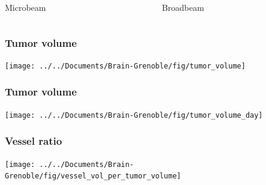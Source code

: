 \documentclass{beamer}					%
\newcommand{\imsize}{\linewidth}
\newlength\imagewidth %
\newlength\imagescale %
\begin{document}
\begin{frame}
\begin{columns}
\begin{column}{0.33\paperwidth}
%
            \centering Microbeam
		\end{column}
		\begin{column}{0.33\paperwidth}
            \pgfmathsetlength{\imagewidth}{\imsize}%
            \def\x{1001/3}%
            \def\y{978/3}%
            \centering Broadbeam
		\end{column}
	\end{columns}
\end{frame}

\renewcommand{\imsize}{0.8\textheight}
\begin{frame}
	\frametitle{Tumor volume}
	\texttt{[image: ../../Documents/Brain-Grenoble/fig/tumor\_volume]}
\end{frame}

\begin{frame}
	\frametitle{Tumor volume}
	\texttt{[image: ../../Documents/Brain-Grenoble/fig/tumor\_volume\_day]}
\end{frame}

\begin{frame}
	\frametitle{Vessel ratio}
	\texttt{[image: ../../Documents/Brain-Grenoble/fig/vessel\_vol\_per\_tumor\_volume]}
\end{frame}
\end{document}
